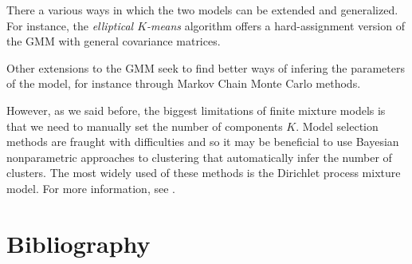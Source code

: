 \documentclass[final,3p,times,twocolumn]{elsarticle}
\begin{document}
There a various ways in which the two models can be extended and generalized.
For instance, the \emph{elliptical $K$-means} algorithm \cite{sung1998} offers a hard-assignment version of the GMM with general covariance matrices.

Other extensions to the GMM seek to find better ways of infering the parameters of the model, for instance through Markov Chain Monte Carlo methods.

However, as we said before, the biggest limitations of finite mixture models is that we need to manually set the number of components $K$.
Model selection methods are fraught with difficulties and so it may be beneficial to use Bayesian nonparametric approaches to clustering that automatically infer the number of clusters.
The most widely used of these methods is the Dirichlet process mixture model. 
For more information, see \cite{Murphy, Teh2010a}.

\appendix



\section*{Bibliography}








\end{document}
